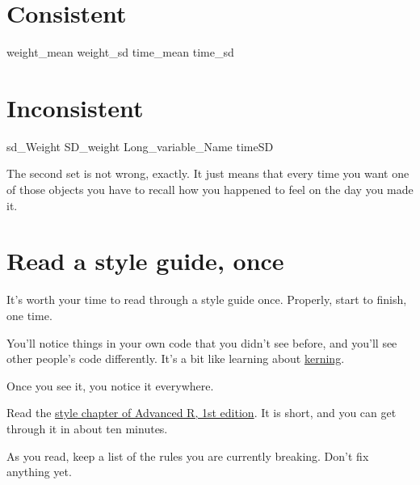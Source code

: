 \documentclass[
  letterpaper,
  justified,
  a4paper]{tufte-book}
\makeatletter
\newenvironment{Shaded}{\begin{snugshade}}{\end{snugshade}}
\newcommand{\NormalTok}[1]{\textcolor[rgb]{0.00,0.23,0.31}{#1}}
\let\rbporigShaded\Shaded
\let\rbporigendShaded\endShaded
\renewenvironment{Shaded}{%
  \begingroup
  \ifdim\linewidth=\rbpbodywidth
    \advance\linewidth by \@tufte@overhang
    \advance\hsize by \@tufte@overhang
    \advance\columnwidth by \@tufte@overhang
  \fi
  \rbporigShaded
}{%
  \rbporigendShaded
  \endgroup
}
\makeatother
\begin{document}
\section{Consistent}

\begin{Shaded}
\begin{Highlighting}[]
\NormalTok{weight\_mean}
\NormalTok{weight\_sd}
\NormalTok{time\_mean}
\NormalTok{time\_sd}
\end{Highlighting}
\end{Shaded}

\section{Inconsistent}

\begin{Shaded}
\begin{Highlighting}[]
\NormalTok{sd\_Weight}
\NormalTok{SD\_weight}
\NormalTok{Long\_variable\_Name}
\NormalTok{timeSD}
\end{Highlighting}
\end{Shaded}

The second set is not wrong, exactly. It just means that every time you
want one of those objects you have to recall how you happened to feel on
the day you made it.

\section{Read a style guide, once}\label{read-a-style-guide-once}

It's worth your time to read through a style guide once. Properly, start
to finish, one time.

You'll notice things in your own code that you didn't see before, and
you'll see other people's code differently. It's a bit like learning
about \href{https://xkcd.com/1015/}{kerning}.

Once you see it, you notice it everywhere.

\begin{tcolorbox}[enhanced jigsaw, arc=.35mm, bottomrule=.15mm, bottomtitle=1mm, breakable, colback=white, colbacktitle=quarto-callout-note-color!10!white, colframe=quarto-callout-note-color-frame, coltitle=black, left=2mm, leftrule=.75mm, opacityback=0, opacitybacktitle=0.6, rightrule=.15mm, title=\textcolor{quarto-callout-note-color}{\faInfo}\hspace{0.5em}{Your Turn}, titlerule=0mm, toprule=.15mm, toptitle=1mm]

Read the \href{http://adv-r.had.co.nz/Style.html}{style chapter of
Advanced R, 1st edition}. It is short, and you can get through it in
about ten minutes.

As you read, keep a list of the rules you are currently breaking. Don't
fix anything yet.

\end{tcolorbox}
\end{document}
